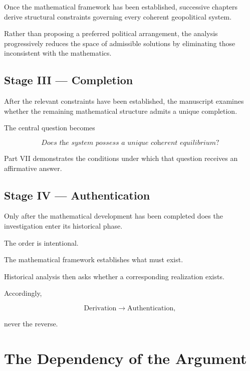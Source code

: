 \documentclass[11pt,openany]{book}
\theoremstyle{plain}
\theoremstyle{definition}
\begin{document}
Once the mathematical framework has been established, successive chapters derive structural constraints governing every coherent geopolitical system.

Rather than proposing a preferred political arrangement, the analysis progressively reduces the space of admissible solutions by eliminating those inconsistent with the mathematics.


\subsection*{Stage III — Completion}

After the relevant constraints have been established, the manuscript examines whether the remaining mathematical structure admits a unique completion.

The central question becomes

\[
\boxed{
\textit{
Does the system possess a unique coherent equilibrium?
}
}
\]

Part VII demonstrates the conditions under which that question receives an affirmative answer.


\subsection*{Stage IV — Authentication}

Only after the mathematical development has been completed does the investigation enter its historical phase.

The order is intentional.

The mathematical framework establishes what must exist.

Historical analysis then asks whether a corresponding realization exists.

Accordingly,

\[
\boxed{
\text{Derivation}
\longrightarrow
\text{Authentication},
}
\]

never the reverse.


\section*{The Dependency of the Argument}
\end{document}

